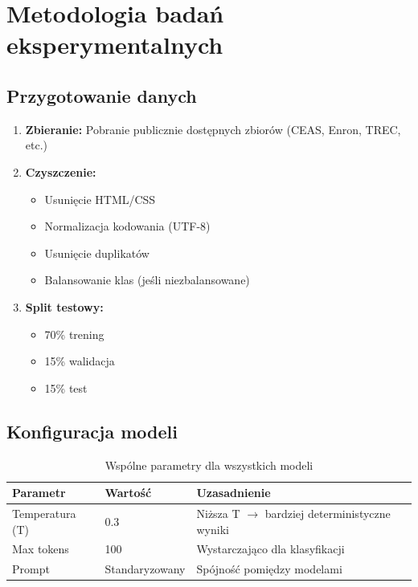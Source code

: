 \documentclass[11pt]{extreport}
\begin{document}
\section{Metodologia badań eksperymentalnych}
\label{sec:metodologia-badawcza}

\subsection{Przygotowanie danych}

\begin{enumerate}
    \item \textbf{Zbieranie:} Pobranie publicznie dostępnych zbiorów (CEAS, Enron, TREC, etc.)
    \item \textbf{Czyszczenie:}
    \begin{itemize}
        \item Usunięcie HTML/CSS
        \item Normalizacja kodowania (UTF-8)
        \item Usunięcie duplikatów
        \item Balansowanie klas (jeśli niezbalansowane)
    \end{itemize}
    \item \textbf{Split testowy:}
    \begin{itemize}
        \item 70\% trening
        \item 15\% walidacja
        \item 15\% test
    \end{itemize}
\end{enumerate}

\subsection{Konfiguracja modeli}

\begin{table}[H]
\centering
\caption{Wspólne parametry dla wszystkich modeli}
\label{tab:parametry}
\begin{tabular}{@{}lll@{}}
\toprule
\textbf{Parametr} & \textbf{Wartość} & \textbf{Uzasadnienie} \\ 
\midrule
Temperatura (T) & 0.3 & Niższa T $\rightarrow$ bardziej deterministyczne wyniki \\
Max tokens & 100 & Wystarczająco dla klasyfikacji \\
Prompt & Standaryzowany & Spójność pomiędzy modelami \\
\bottomrule
\end{tabular}
\end{table}
\end{document}
